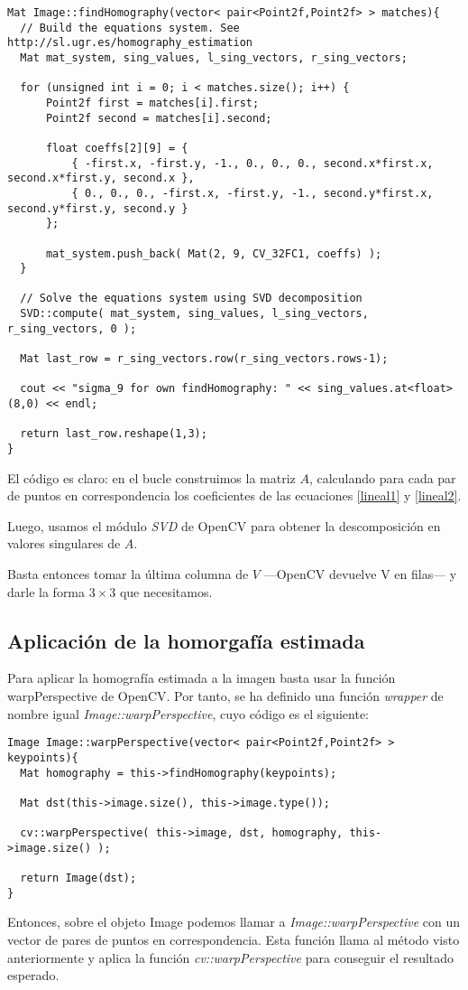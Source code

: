 \documentclass[a4paper, 11pt]{article}
\theoremstyle{definition}
\theoremstyle{theorem}
\begin{document}
  \begin{lstlisting}
Mat Image::findHomography(vector< pair<Point2f,Point2f> > matches){
  // Build the equations system. See http://sl.ugr.es/homography_estimation
  Mat mat_system, sing_values, l_sing_vectors, r_sing_vectors;

  for (unsigned int i = 0; i < matches.size(); i++) {
      Point2f first = matches[i].first;
      Point2f second = matches[i].second;

      float coeffs[2][9] = {
          { -first.x, -first.y, -1., 0., 0., 0., second.x*first.x, second.x*first.y, second.x },
          { 0., 0., 0., -first.x, -first.y, -1., second.y*first.x, second.y*first.y, second.y }
      };

      mat_system.push_back( Mat(2, 9, CV_32FC1, coeffs) );
  }

  // Solve the equations system using SVD decomposition
  SVD::compute( mat_system, sing_values, l_sing_vectors, r_sing_vectors, 0 );

  Mat last_row = r_sing_vectors.row(r_sing_vectors.rows-1);

  cout << "sigma_9 for own findHomography: " << sing_values.at<float>(8,0) << endl;

  return last_row.reshape(1,3);
}
  \end{lstlisting}

  El código es claro: en el bucle construimos la matriz $A$, calculando para cada par de puntos en correspondencia los coeficientes de las ecuaciones \ref{lineal1} y \ref{lineal2}.

  Luego, usamos el módulo \emph{SVD} de OpenCV para obtener la descomposición en valores singulares de $A$.

  Basta entonces tomar la última columna de $V$ ---OpenCV devuelve V en filas--- y darle la forma $3\times3$ que necesitamos.

  \subsection{Aplicación de la homorgafía estimada}
  Para aplicar la homografía estimada a la imagen basta usar la función warpPerspective de OpenCV. Por tanto, se ha definido una función \emph{wrapper} de nombre igual \emph{Image::warpPerspective}, cuyo código es el siguiente:
  \begin{lstlisting}
Image Image::warpPerspective(vector< pair<Point2f,Point2f> > keypoints){
  Mat homography = this->findHomography(keypoints);

  Mat dst(this->image.size(), this->image.type());

  cv::warpPerspective( this->image, dst, homography, this->image.size() );

  return Image(dst);
}
  \end{lstlisting}

  Entonces, sobre el objeto Image podemos llamar a \emph{Image::warpPerspective} con un vector de pares de puntos en correspondencia. Esta función llama al método visto anteriormente y aplica la función \emph{cv::warpPerspective} para conseguir el resultado esperado.
\end{document}
